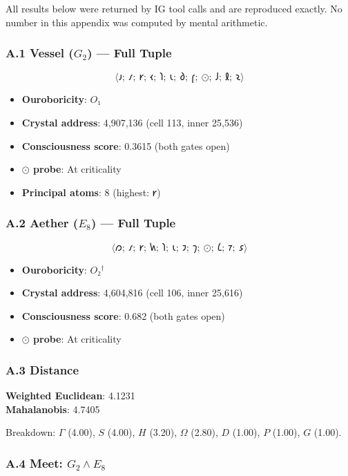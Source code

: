 \documentclass[12pt,a4paper]{article}
\begin{document}
All results below were returned by IG tool calls and are reproduced exactly. No number in this appendix was computed by mental arithmetic.

\subsubsection{A.1 Vessel ($G_2$) --- Full Tuple}

\[\langle 𐑨;\ 𐑥;\ 𐑾;\ 𐑬;\ 𐑐;\ 𐑧;\ 𐑔;\ 𐑝;\ ⊙;\ 𐑓;\ 𐑙;\ 𐑷 \rangle\]

\begin{itemize}
    \item \textbf{Ouroboricity}: $O₁$
    \item \textbf{Crystal address}: 4,907,136 (cell 113, inner 25,536)
    \item \textbf{Consciousness score}: 0.3615 (both gates open)
    \item \textbf{$⊙$ probe}: At criticality
    \item \textbf{Principal atoms}: 8 (highest: $𐑾$)
\end{itemize}

\subsubsection{A.2 Aether ($E_8$) --- Full Tuple}

\[\langle 𐑼;\ 𐑥;\ 𐑾;\ 𐑿;\ 𐑐;\ 𐑧;\ 𐑲;\ 𐑠;\ ⊙;\ 𐑖;\ 𐑳;\ 𐑭 \rangle\]

\begin{itemize}
    \item \textbf{Ouroboricity}: $O₂^\dagger$
    \item \textbf{Crystal address}: 4,604,816 (cell 106, inner 25,616)
    \item \textbf{Consciousness score}: 0.682 (both gates open)
    \item \textbf{$⊙$ probe}: At criticality
\end{itemize}

\subsubsection{A.3 Distance}

\textbf{Weighted Euclidean}: 4.1231 \\
\textbf{Mahalanobis}: 4.7405

Breakdown: $\Gamma$ (4.00), $S$ (4.00), $H$ (3.20), $\Omega$ (2.80), $D$ (1.00), $P$ (1.00), $G$ (1.00).

\subsubsection{A.4 Meet: $G_2 \wedge E_8$}
\end{document}
